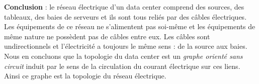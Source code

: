 
{\bf Conclusion} : 
le r\'eseau \'electrique d'un data center comprend des sources, des tableaux, des baies de serveurs et  ils sont tous reli\'es  par des c\^ables \'electriques. Les \'equipements de ce r\'eseau ne s'alimentent pas soi-m\^eme et les \'equipements de m\^eme nature ne poss\`edent pas de c\^ables entre eux. Les c\^ables sont undirectionnels et l'\'electricit\'e a toujours le m\^eme sens : de la source aux baies.
Nous en concluons que la topologie du data center est un {\em graphe orient\'e sans circuit} induit par le sens de la circulation du courant \'electrique sur ces liens. Ainsi ce graphe est la topologie du r\'eseau \'electrique. 

